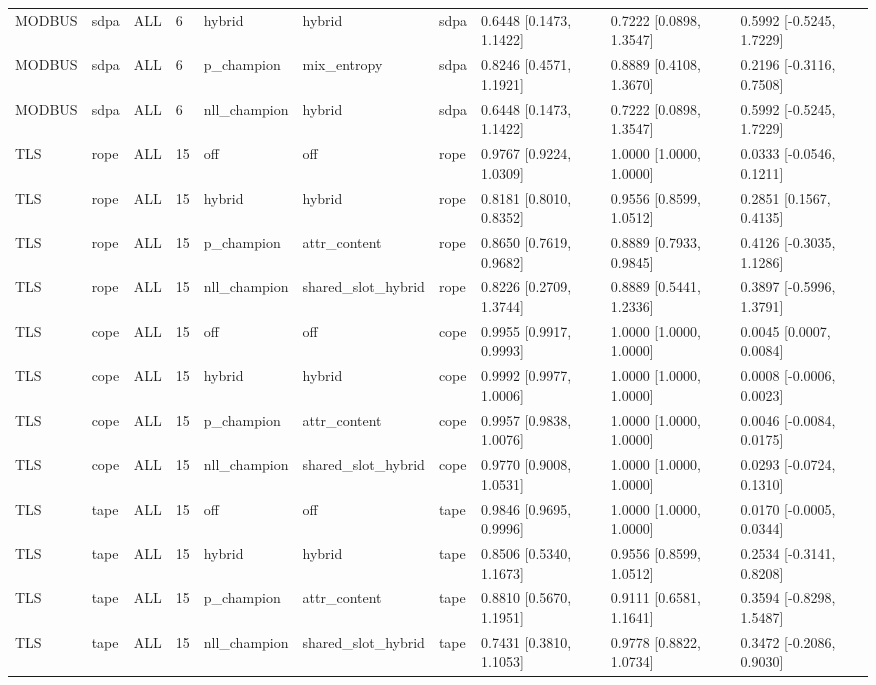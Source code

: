 \begin{tabular}{llllllllll}
MODBUS & sdpa & ALL & 6 & hybrid & hybrid & sdpa & 0.6448 [0.1473, 1.1422] & 0.7222 [0.0898, 1.3547] & 0.5992 [-0.5245, 1.7229] \\
MODBUS & sdpa & ALL & 6 & p\_champion & mix\_entropy & sdpa & 0.8246 [0.4571, 1.1921] & 0.8889 [0.4108, 1.3670] & 0.2196 [-0.3116, 0.7508] \\
MODBUS & sdpa & ALL & 6 & nll\_champion & hybrid & sdpa & 0.6448 [0.1473, 1.1422] & 0.7222 [0.0898, 1.3547] & 0.5992 [-0.5245, 1.7229] \\
TLS & rope & ALL & 15 & off & off & rope & 0.9767 [0.9224, 1.0309] & 1.0000 [1.0000, 1.0000] & 0.0333 [-0.0546, 0.1211] \\
TLS & rope & ALL & 15 & hybrid & hybrid & rope & 0.8181 [0.8010, 0.8352] & 0.9556 [0.8599, 1.0512] & 0.2851 [0.1567, 0.4135] \\
TLS & rope & ALL & 15 & p\_champion & attr\_content & rope & 0.8650 [0.7619, 0.9682] & 0.8889 [0.7933, 0.9845] & 0.4126 [-0.3035, 1.1286] \\
TLS & rope & ALL & 15 & nll\_champion & shared\_slot\_hybrid & rope & 0.8226 [0.2709, 1.3744] & 0.8889 [0.5441, 1.2336] & 0.3897 [-0.5996, 1.3791] \\
TLS & cope & ALL & 15 & off & off & cope & 0.9955 [0.9917, 0.9993] & 1.0000 [1.0000, 1.0000] & 0.0045 [0.0007, 0.0084] \\
TLS & cope & ALL & 15 & hybrid & hybrid & cope & 0.9992 [0.9977, 1.0006] & 1.0000 [1.0000, 1.0000] & 0.0008 [-0.0006, 0.0023] \\
TLS & cope & ALL & 15 & p\_champion & attr\_content & cope & 0.9957 [0.9838, 1.0076] & 1.0000 [1.0000, 1.0000] & 0.0046 [-0.0084, 0.0175] \\
TLS & cope & ALL & 15 & nll\_champion & shared\_slot\_hybrid & cope & 0.9770 [0.9008, 1.0531] & 1.0000 [1.0000, 1.0000] & 0.0293 [-0.0724, 0.1310] \\
TLS & tape & ALL & 15 & off & off & tape & 0.9846 [0.9695, 0.9996] & 1.0000 [1.0000, 1.0000] & 0.0170 [-0.0005, 0.0344] \\
TLS & tape & ALL & 15 & hybrid & hybrid & tape & 0.8506 [0.5340, 1.1673] & 0.9556 [0.8599, 1.0512] & 0.2534 [-0.3141, 0.8208] \\
TLS & tape & ALL & 15 & p\_champion & attr\_content & tape & 0.8810 [0.5670, 1.1951] & 0.9111 [0.6581, 1.1641] & 0.3594 [-0.8298, 1.5487] \\
TLS & tape & ALL & 15 & nll\_champion & shared\_slot\_hybrid & tape & 0.7431 [0.3810, 1.1053] & 0.9778 [0.8822, 1.0734] & 0.3472 [-0.2086, 0.9030] \\

\end{tabular}
